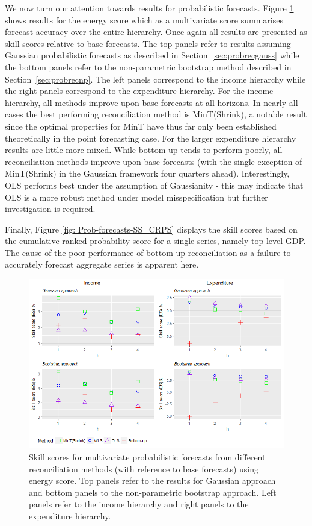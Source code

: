 \documentclass[graybox]{svmult}
\begin{document}
We now turn our attention towards results for probabilistic forecasts. Figure \ref{fig: Prob-forecasts-SS_ES} shows results for the energy score which as a multivariate score summarises forecast accuracy over the entire hierarchy.  Once again all results are presented as skill scores relative to base forecasts.  The top panels refer to results assuming Gaussian probabilistic forecasts as described in Section~\ref{sec:probrecgauss} while the bottom panels refer to the non-parametric bootstrap method described in Section~\ref{sec:probrecnp}.  The left panels correspond to the income hierarchy while the right panels correspond to the expenditure hierarchy. For the income hierarchy, all methods improve upon base forecasts at all horizons.  In nearly all cases the best performing reconciliation method is MinT(Shrink), a notable result since the optimal properties for MinT have thus far only been established theoretically in the point forecasting case.  For the larger expenditure hierarchy results are little more mixed.  While bottom-up tends to perform poorly, all reconciliation methods improve upon base forecasts (with the single exception of MinT(Shrink) in the Gaussian framework four quarters ahead).  Interestingly, OLS performs best under the assumption of Gaussianity - this may indicate that OLS is a more robust method under model misspecification but further investigation is required.

Finally, Figure \ref{fig: Prob-forecasts-SS_CRPS} displays the skill scores based on the cumulative ranked probability score for a single series, namely top-level GDP.  The cause of the poor performance of bottom-up reconciliation as a failure to accurately forecast aggregate series is apparent here.

\begin{figure}[t]
	\centering
	\small
	\includegraphics[width=\textwidth]{Figs/Results/ProbF_MultivS.png}
	\caption{Skill scores for multivariate probabilistic forecasts from different reconciliation methods (with reference to base forecasts) using energy score. Top panels refer to the results for Gaussian approach and bottom panels to the non-parametric bootstrap approach. Left panels refer to the income hierarchy and right panels to the expenditure hierarchy.}
	\label{fig: Prob-forecasts-SS_ES}
\end{figure}
\end{document}
